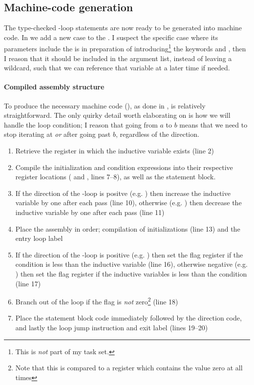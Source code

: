 \newpage
\subsection{Machine-code generation}
The type-checked -loop statements are now ready to be generated into
machine code. In  we add a new case to the
. I suspect the specific case where its parameters include
the  is in preparation of introducing\footnote{This is
{\it not} part of my task set.} the keywords  and ,
then I reason that it should be included in the argument list, instead of
leaving a wildcard, such that we can reference that variable at a later time
if needed.

\paragraph{Compiled assembly structure}
To produce the necessary machine code
(), as done in
, is relatively straightforward. The only quirky detail
worth elaborating on is how we will handle the loop condition; I reason that
going from $a$ to $b$ means that we need to stop iterating at {\it or} after
going past $b$, regardless of the direction.
\begin{enumerate}
	\item Retrieve the register in which the inductive variable exists (line
	2)
	\item Compile the initialization and condition expressions into their
	respective register locations ( and , lines 7--8),
	as well as the statement block.
	\item If the direction of the -loop is positve (e.g. ) then increase the inductive variable by one after each pass
	(line 10), otherwise (e.g. ) then decrease the
	inductive variable by one after each pass (line 11)
	\item Place the assembly in order; compilation of initializations (line
	13) and the entry loop label
	\item If the direction of the -loop is positive (e.g. ) then set the flag register  if the condition is
	less than the inductive variable (line 16), otherwise negative (e.g.
	) then set the flag register  if the
	inductive variables is less than the condition (line 17)
	\item Branch out of the loop if the flag is {\it not} zero\footnote{Note
	that this is compared to a register which contains the value zero at all
	times} (line 18)
	\item Place the statement block code immediately followed by the direction
	code, and lastly the loop jump instruction and exit label (lines 19--20)
\end{enumerate}

